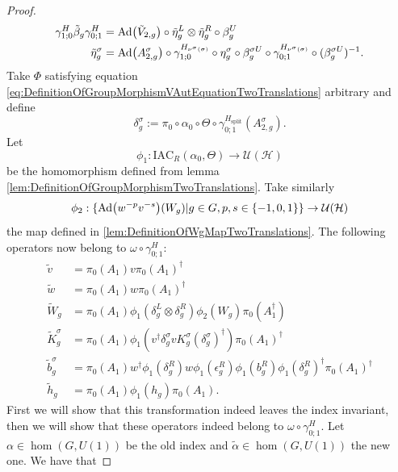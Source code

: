 \documentclass[12pt,a4paper,twoside]{article}
\newcommand{\IAC}{\textrm{IAC}}
\let\originalleft\left
\let\originalright\right
\renewcommand{\left}{\mathopen{}\mathclose\bgroup\originalleft}
\renewcommand{\right}{\aftergroup\egroup\originalright}
\newcommand{\UU}{\mathcal U}
\newcommand{\HH}{\mathcal H}
\newcommand{\Ad}[1]{\textrm{Ad}\left(#1\right)}
\theoremstyle{definition}
\numberwithin{equation}{section}
\begin{document}
\begin{proof}
	\begin{align}
		\label{eq:IndexInvariantUnderLGAEtaTildeDefiniton1TwoTrans}
		\gamma^{H}_{1;0}\tilde{\beta}_g\gamma^{H}_{0;1}&=\Ad{\tilde V_{2,g}}\circ\tilde{\eta}_g^L\otimes\tilde{\eta}_g^R\circ\beta_g^U\\
		\label{eq:IndexInvariantUnderLGAEtaTildeDefiniton2TwoTrans}
		\tilde{\eta}_g^\sigma&=\Ad{A_{2,g}^\sigma}\circ\gamma^{H_{\nu^{\sigma}(\sigma)}}_{1;0}\circ\eta_g^\sigma\circ\beta_g^{\sigma U}\circ\gamma^{H_{\nu^{\sigma}(\sigma)}}_{0;1}\circ(\beta_g^{\sigma U})^{-1}.
	\end{align}
	Take $\Phi$ satisfying equation \ref{eq:DefinitionOfGroupMorphismVAutEquationTwoTranslations} arbitrary and define 
	\begin{equation}
		\delta_g^\sigma:=\pi_0\circ\alpha_0\circ\Theta\circ\gamma^{H_{\text{split}}}_{0;1}(A_{2,g}^\sigma).
	\end{equation}
	Let
	\begin{equation}
		\phi_1:\IAC_R(\alpha_0,\Theta) \rightarrow \UU(\HH)
	\end{equation}
	be the homomorphism defined from lemma \ref{lem:DefinitionOfGroupMorphismTwoTranslations}. Take similarly
	\begin{equation}
		\phi_2:\{\Ad{w^{-p}v^{-s}}(W_g)|g\in G,p,s\in\{-1,0,1\}\}\rightarrow \UU(\HH)
	\end{equation}
	the map defined in \ref{lem:DefinitionOfWgMapTwoTranslations}. The following operators now belong to $\omega\circ\gamma^{H}_{0;1}:$
	\begin{align}
		\tilde{v}&=\pi_0(A_1)v\pi_0(A_1)^\dagger\\
		\tilde{w}&=\pi_0(A_1)w\pi_0(A_1)^\dagger\\
		\tilde{W}_g&=\pi_0(A_1)\phi_1(\delta^L_g\otimes\delta^R_g)\phi_2( W_g)\pi_0(A_1^\dagger)\\
		\tilde{K}_g^\sigma&=\pi_0(A_1)\phi_1(v^\dagger \delta_g^\sigma v K_g^\sigma (\delta_g^\sigma)^\dagger) \pi_0(A_1)^\dagger\\
		\tilde{b}_g^\sigma&=\pi_0(A_1)w^\dagger \phi_1(\delta_g^R)w \phi_1(\epsilon_g^R)\phi_1(b_g^R)\phi_1(\delta_g^R)^\dagger\pi_0(A_1)^\dagger\\
		\tilde{h}_g&=\pi_0(A_1)\phi_1(h_g)\pi_0(A_1).
	\end{align}
	First we will show that this transformation indeed leaves the index invariant, then we will show that these operators indeed belong to $\omega\circ\gamma^H_{0;1}$. Let $\alpha\in\hom(G,U(1))$ be the old index and $\tilde{\alpha}\in\hom(G,U(1))$ the new one. We have that

\end{proof}
\end{document}
